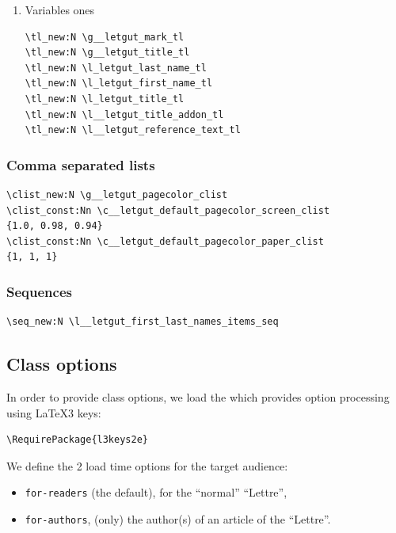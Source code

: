 \documentclass{letgut}
\begin{document}
\begin{enumerate}
\item Variables ones
\label{sec:org4c5e60d}

\begin{lstlisting}
\tl_new:N \g__letgut_mark_tl
\tl_new:N \g__letgut_title_tl
\tl_new:N \l_letgut_last_name_tl
\tl_new:N \l_letgut_first_name_tl
\tl_new:N \l_letgut_title_tl
\tl_new:N \l__letgut_title_addon_tl
\tl_new:N \l__letgut_reference_text_tl
\end{lstlisting}
\end{enumerate}

\subsubsection{Comma separated lists}
\label{sec:org158b7a3}

\begin{lstlisting}
\clist_new:N \g__letgut_pagecolor_clist
\clist_const:Nn \c__letgut_default_pagecolor_screen_clist
{1.0, 0.98, 0.94}
\clist_const:Nn \c__letgut_default_pagecolor_paper_clist
{1, 1, 1}
\end{lstlisting}

\subsubsection{Sequences}
\label{sec:orgaa04440}

\begin{lstlisting}
\seq_new:N \l__letgut_first_last_names_items_seq
\end{lstlisting}

\subsection{Class options}
\label{sec:orgef3017c}

In order to provide class options, we load the  which provides
\LaTeXe{} option processing using \LaTeX3 keys:

\begin{lstlisting}
\RequirePackage{l3keys2e}
\end{lstlisting}

We define the 2 load time options for the target audience:

\begin{itemize}
\item \lstinline+for-readers+ (the default), for the “normal” “Lettre”,
\item \lstinline+for-authors+, (only) the author(s) of an article of the “Lettre”.
\end{itemize}
\end{document}

